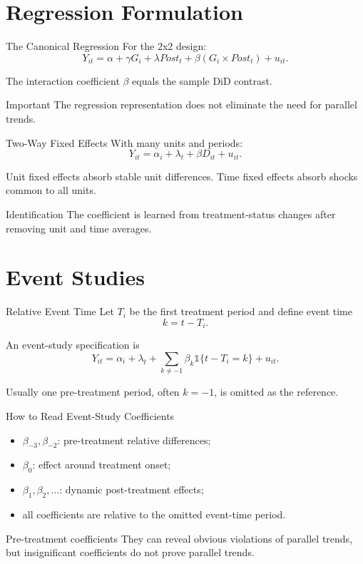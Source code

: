 \documentclass[aspectratio=169,11pt]{beamer}
\begin{document}
\section{Regression Formulation}

\begin{frame}{The Canonical Regression}
For the 2x2 design:
\[
Y_{it}
=
\alpha
+
\gamma G_i
+
\lambda Post_t
+
\beta(G_i\times Post_t)
+
u_{it}.
\]

The interaction coefficient \(\beta\) equals the sample DiD contrast.

\begin{alertblock}{Important}
The regression representation does not eliminate the need for parallel trends.
\end{alertblock}
\end{frame}

\begin{frame}{Two-Way Fixed Effects}
With many units and periods:
\[
Y_{it}
=
\alpha_i
+
\lambda_t
+
\beta D_{it}
+
u_{it}.
\]

Unit fixed effects absorb stable unit differences. Time fixed effects absorb shocks common to all units.

\begin{block}{Identification}
The coefficient is learned from treatment-status changes after removing unit and time averages.
\end{block}
\end{frame}

\section{Event Studies}

\begin{frame}{Relative Event Time}
Let \(T_i\) be the first treatment period and define event time
\[
k=t-T_i.
\]

An event-study specification is
\[
Y_{it}
=
\alpha_i+\lambda_t
+
\sum_{k\neq -1}
\beta_k
\mathbb{1}\{t-T_i=k\}
+
u_{it}.
\]

Usually one pre-treatment period, often \(k=-1\), is omitted as the reference.
\end{frame}

\begin{frame}{How to Read Event-Study Coefficients}
\begin{itemize}
\item \(\beta_{-3},\beta_{-2}\): pre-treatment relative differences;
\item \(\beta_0\): effect around treatment onset;
\item \(\beta_1,\beta_2,\ldots\): dynamic post-treatment effects;
\item all coefficients are relative to the omitted event-time period.
\end{itemize}

\begin{alertblock}{Pre-treatment coefficients}
They can reveal obvious violations of parallel trends, but insignificant coefficients do not prove parallel trends.
\end{alertblock}
\end{frame}
\end{document}
